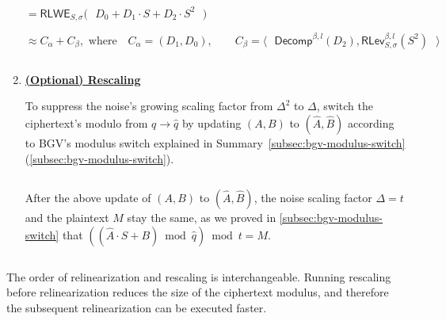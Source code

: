 \begin{tcolorbox}[title={\textbf{\tboxlabel{\ref*{subsec:bgv-mult-cipher}} BGV Ciphertext-to-Ciphertext Multiplication}}]
\begin{enumerate}
$= \textsf{RLWE}_{S, \sigma}\bm{(}\text{ }D_0 + D_1\cdot S + D_2\cdot S^2\text{ }\bm{)}$

$  \approx C_\alpha + C_\beta, \text{ where } \text{ } C_\alpha = (D_1, D_0), \text{ }\text{ }\text{ } C_\beta = \bm{\langle}  \text{ } \textsf{Decomp}^{\beta, l}(D_2), \textsf{RLev}_{S, \sigma}^{\beta, l}(S^2)  \text{ } \bm{\rangle}$ 

$ $

\item \textbf{\underline{(Optional) Rescaling}}

To suppress the noise's growing scaling factor from $\Delta^2$ to $\Delta$, switch the ciphertext's modulo from $q \rightarrow \hat q$ by updating $(A, B)$ to $(\hat A, \hat B)$ according to BGV's modulus switch explained in Summary~\ref*{subsec:bgv-modulus-switch} (\autoref{subsec:bgv-modulus-switch}).

$ $

After the above update of $(A, B)$ to $(\hat A, \hat B)$, the noise scaling factor $\Delta = t$ and the plaintext $M$ stay the same, as we proved in \autoref{subsec:bgv-modulus-switch} that $((\hat A \cdot S + B) \bmod \hat q) \bmod t = M$.

$ $



\end{enumerate}

 The order of relinearization and rescaling is interchangeable. Running rescaling before relinearization reduces the size of the ciphertext modulus, and therefore the subsequent relinearization can be executed faster. 

\end{tcolorbox}

